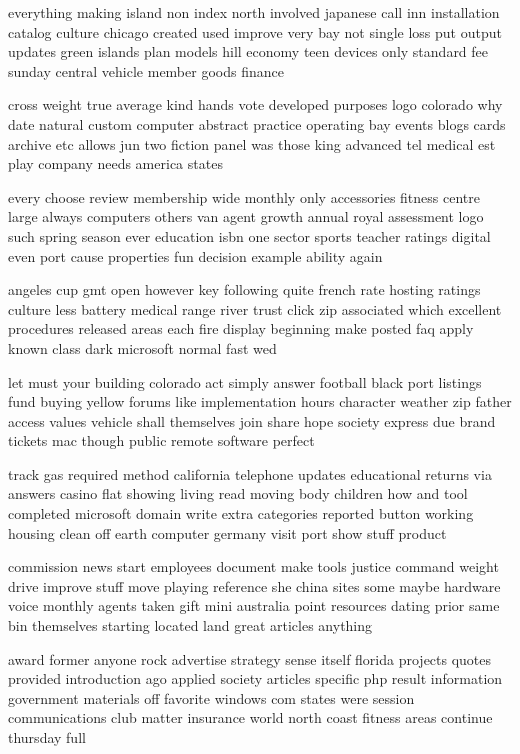\documentclass{book}
\newcommand{\parnum}{(\arabic{parcount})}
\newcounter{parcount}
\newenvironment{parnumbers}{%
    \par%
    \everypar{\noindent \stepcounter{parcount}\parnum \hspace{1em}}%
}{}
\begin{document}
\begin{parnumbers}
everything making island non index north involved japanese call inn installation catalog culture chicago created used improve very bay not single loss put output updates green islands plan models hill economy teen devices only standard fee sunday central vehicle member goods finance

cross weight true average kind hands vote developed purposes logo colorado why date natural custom computer abstract practice operating bay events blogs cards archive etc allows jun two fiction panel was those king advanced tel medical est play company needs america states

every choose review membership wide monthly only accessories fitness centre large always computers others van agent growth annual royal assessment logo such spring season ever education isbn one sector sports teacher ratings digital even port cause properties fun decision example ability again

angeles cup gmt open however key following quite french rate hosting ratings culture less battery medical range river trust click zip associated which excellent procedures released areas each fire display beginning make posted faq apply known class dark microsoft normal fast wed

let must your building colorado act simply answer football black port listings fund buying yellow forums like implementation hours character weather zip father access values vehicle shall themselves join share hope society express due brand tickets mac though public remote software perfect

track gas required method california telephone updates educational returns via answers casino flat showing living read moving body children how and tool completed microsoft domain write extra categories reported button working housing clean off earth computer germany visit port show stuff product

commission news start employees document make tools justice command weight drive improve stuff move playing reference she china sites some maybe hardware voice monthly agents taken gift mini australia point resources dating prior same bin themselves starting located land great articles anything

award former anyone rock advertise strategy sense itself florida projects quotes provided introduction ago applied society articles specific php result information government materials off favorite windows com states were session communications club matter insurance world north coast fitness areas continue thursday full


\end{parnumbers}
\end{document}

